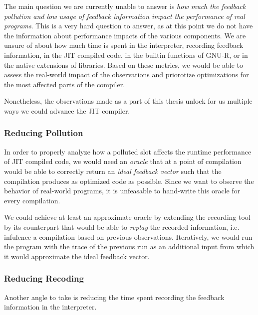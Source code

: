 The main question we are currently unable to answer is \textit{how much the feedback pollution and low usage of feedback information impact the performance of real programs}. This is a very hard question to answer, as at this point we do not have the information about performance impacts of the various components. We are unsure of about how much time is spent in the interpreter, recording feedback information, in the JIT compiled code, in the builtin functions of GNU-R, or in the native extensions of libraries. Based on these metrics, we would be able to assess the real-world impact of the observations and priorotize optimizations for the most affected parts of the compiler.

Nonetheless, the observations made as a part of this thesis unlock for us multiple ways we could advance the JIT compiler.

\subsubsection*{Reducing Pollution}

In order to properly analyze how a polluted slot affects the runtime performance of JIT compiled code, we would need an \textit{oracle} that at a point of compilation would be able to correctly return an \textit{ideal feedback vector} such that the compilation produces as optimized code as possible. Since we want to observe the behavior of real-world programs, it is unfeasable to hand-write this oracle for every compilation.

We could achieve at least an approximate oracle by extending the recording tool by its counterpart that would be able to \textit{replay} the recorded information, i.e. infulence a compilation based on previous observations. Iteratively, we would run the program with the trace of the previous run as an additional input from which it would approximate the ideal feedback vector.

\subsubsection*{Reducing Recoding}

Another angle to take is reducing the time spent recording the feedback information in the interpreter.


